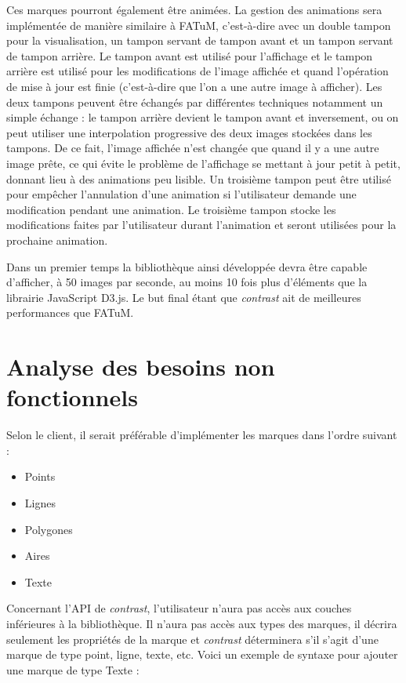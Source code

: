 \documentclass[12pt]{article}
\begin{document}
Ces marques pourront également être animées. La gestion des animations sera implémentée de manière similaire
à FATuM, c'est-à-dire avec un double tampon pour la visualisation, un tampon servant de tampon avant et un tampon servant de tampon arrière. Le tampon avant est utilisé pour l'affichage et le tampon arrière est utilisé pour les modifications de l'image affichée et quand l'opération de mise à jour est finie (c'est-à-dire que l'on a une autre image à afficher). Les deux tampons peuvent être échangés par différentes techniques notamment un simple échange : le tampon arrière devient le tampon avant et inversement, ou on peut utiliser une interpolation progressive des deux images stockées dans les tampons. De ce fait, l'image affichée n'est changée que quand il y a une autre image prête, ce qui évite le problème de l'affichage se mettant à jour petit à petit, donnant lieu à des animations peu lisible. Un troisième tampon peut être utilisé pour empêcher l'annulation d'une animation si l'utilisateur demande une modification pendant une animation. Le troisième tampon stocke les modifications faites par l'utilisateur durant l'animation et seront utilisées pour la prochaine animation.

Dans un premier temps la bibliothèque ainsi développée devra être capable d'afficher,
à 50 images par seconde, au moins 10 fois plus d’éléments que la librairie JavaScript D3.js.
Le but final étant que \textit{contrast} ait de meilleures performances que FATuM.

\section{Analyse des besoins non fonctionnels}

Selon le client, il serait préférable d'implémenter les marques dans l'ordre suivant :
\begin{itemize}
    \item Points
    \item Lignes
    \item Polygones
    \item Aires
    \item Texte
\end{itemize}

Concernant l'API de \textit{contrast}, l'utilisateur n'aura pas accès aux
couches inférieures à la bibliothèque. Il n'aura pas accès aux types des marques,
il décrira seulement les propriétés de la marque et \textit{contrast} déterminera
s'il s'agit d'une marque de type point, ligne, texte, etc.
Voici un exemple de syntaxe pour ajouter une marque de type Texte :
\end{document}
